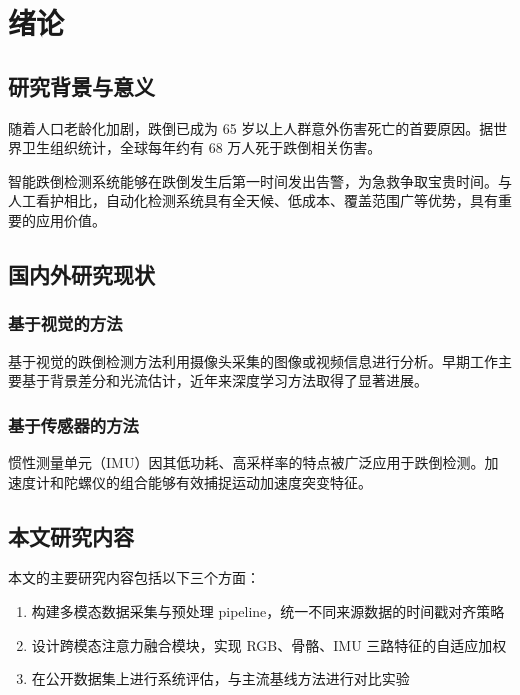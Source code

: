 \section{绪论}\label{第1章-绪论}

\subsection{研究背景与意义}\label{1-1-研究背景与意义}

随着人口老龄化加剧，跌倒已成为 65 岁以上人群意外伤害死亡的首要原因\cite{ref1}。据世界卫生组织统计，全球每年约有 68 万人死于跌倒相关伤害\cite{ref2}。


智能跌倒检测系统能够在跌倒发生后第一时间发出告警，为急救争取宝贵时间。与人工看护相比，自动化检测系统具有全天候、低成本、覆盖范围广等优势，具有重要的应用价值。


\subsection{国内外研究现状}\label{1-2-国内外研究现状}

\subsubsection{基于视觉的方法}\label{1-2-1-基于视觉的方法}

基于视觉的跌倒检测方法利用摄像头采集的图像或视频信息进行分析。早期工作主要基于背景差分和光流估计\cite{ref3}，近年来深度学习方法取得了显著进展。


\subsubsection{基于传感器的方法}\label{1-2-2-基于传感器的方法}

惯性测量单元（IMU）因其低功耗、高采样率的特点被广泛应用于跌倒检测\cite{ref4}。加速度计和陀螺仪的组合能够有效捕捉运动加速度突变特征。


\subsection{本文研究内容}\label{1-3-本文研究内容}

本文的主要研究内容包括以下三个方面：


\begin{enumerate}[label=（\arabic*）]
  \item 构建多模态数据采集与预处理 pipeline，统一不同来源数据的时间戳对齐策略
  \item 设计跨模态注意力融合模块，实现 RGB、骨骼、IMU 三路特征的自适应加权
  \item 在公开数据集上进行系统评估，与主流基线方法进行对比实验
\end{enumerate}
